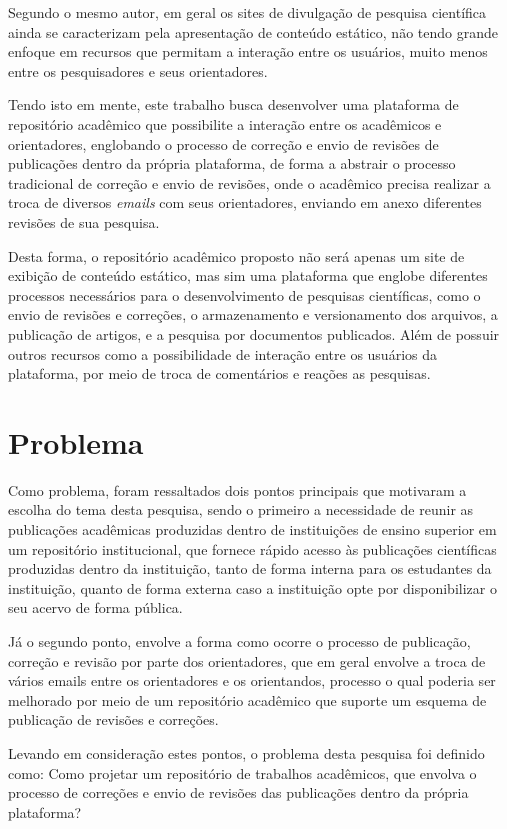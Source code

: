 Segundo o mesmo autor, em geral os sites de divulgação de pesquisa
científica ainda se caracterizam pela apresentação de conteúdo estático,
não tendo grande enfoque em recursos que permitam a interação entre os
usuários, muito menos entre os pesquisadores e seus orientadores.

Tendo isto em mente, este trabalho busca desenvolver uma plataforma de
repositório acadêmico que possibilite a interação entre os acadêmicos e
orientadores, englobando o processo de correção e envio de revisões de
publicações dentro da própria plataforma, de forma a abstrair o processo
tradicional de correção e envio de revisões, onde o acadêmico precisa
realizar a troca de diversos \emph{emails} com seus orientadores,
enviando em anexo diferentes revisões de sua pesquisa.

Desta forma, o repositório acadêmico proposto não será apenas um site
de exibição de conteúdo estático, mas sim uma plataforma que englobe
diferentes processos necessários para o desenvolvimento de pesquisas
científicas, como o envio de revisões e correções, o armazenamento
e versionamento dos arquivos, a publicação de artigos, e a pesquisa por
documentos publicados. Além de possuir outros recursos como a possibilidade
de interação entre os usuários da plataforma, por meio de troca de
comentários e reações as pesquisas.

\section{Problema} \label{sec::Problem}

Como problema, foram ressaltados dois pontos principais que motivaram a escolha do tema desta pesquisa, sendo o primeiro a necessidade de reunir as publicações acadêmicas produzidas dentro de instituições de ensino superior em um repositório institucional, que fornece rápido acesso às publicações científicas produzidas dentro da instituição, tanto de forma interna para os estudantes da instituição, quanto de forma externa caso a instituição opte por disponibilizar o seu acervo de forma pública.

Já o segundo ponto, envolve a forma como ocorre o processo de publicação, correção e revisão por parte dos orientadores, que em geral envolve a troca de vários emails entre os orientadores e os orientandos, processo o qual poderia ser melhorado por meio de um repositório acadêmico que suporte um esquema de publicação de revisões e correções.

Levando em consideração estes pontos, o problema desta pesquisa foi definido como: Como projetar um repositório de trabalhos acadêmicos, que envolva o processo de correções e envio de revisões das publicações dentro da própria plataforma?


